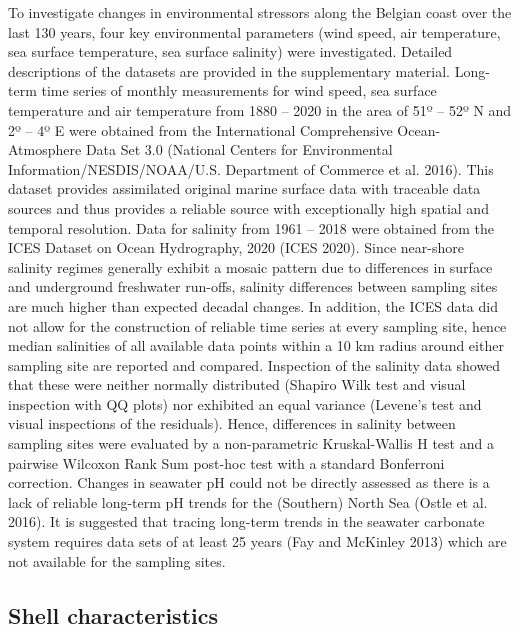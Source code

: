 \documentclass[smallextended]{svjour3}       %
\begin{document}
To investigate changes in environmental stressors along the Belgian
coast over the last 130 years, four key environmental parameters (wind
speed, air temperature, sea surface temperature, sea surface salinity)
were investigated. Detailed descriptions of the datasets are provided in
the supplementary material. Long-term time series of monthly
measurements for wind speed, sea surface temperature and air temperature
from 1880 -- 2020 in the area of 51º -- 52º N and 2º -- 4º E were
obtained from the International Comprehensive Ocean-Atmosphere Data Set
3.0 (National Centers for Environmental Information/NESDIS/NOAA/U.S.
Department of Commerce et al. 2016). This dataset provides assimilated
original marine surface data with traceable data sources and thus
provides a reliable source with exceptionally high spatial and temporal
resolution. Data for salinity from 1961 -- 2018 were obtained from the
ICES Dataset on Ocean Hydrography, 2020 (ICES 2020). Since near-shore
salinity regimes generally exhibit a mosaic pattern due to differences
in surface and underground freshwater run-offs, salinity differences
between sampling sites are much higher than expected decadal changes. In
addition, the ICES data did not allow for the construction of reliable
time series at every sampling site, hence median salinities of all
available data points within a 10 km radius around either sampling site
are reported and compared. Inspection of the salinity data showed that
these were neither normally distributed (Shapiro Wilk test and visual
inspection with QQ plots) nor exhibited an equal variance (Levene's test
and visual inspections of the residuals). Hence, differences in salinity
between sampling sites were evaluated by a non-parametric Kruskal-Wallis
H test and a pairwise Wilcoxon Rank Sum post-hoc test with a standard
Bonferroni correction. Changes in seawater pH could not be directly
assessed as there is a lack of reliable long-term pH trends for the
(Southern) North Sea (Ostle et al. 2016). It is suggested that tracing
long-term trends in the seawater carbonate system requires data sets of
at least 25 years (Fay and McKinley 2013) which are not available for
the sampling sites.

\hypertarget{shell-characteristics}{%
\subsection{Shell characteristics}\label{shell-characteristics}}
\end{document}
